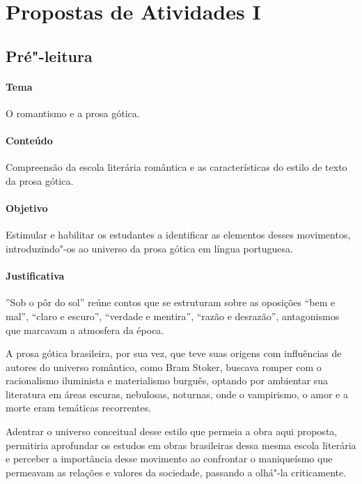 \documentclass[12pt]{extarticle}
\begin{document}
\tableofcontents


\section{Propostas de Atividades I}


\subsection{Pré"-leitura}


\paragraph{Tema} O romantismo e a prosa gótica.

\paragraph{Conteúdo} Compreensão da escola literária romântica e as 
características do estilo de texto da prosa gótica.

\paragraph{Objetivo} Estimular e habilitar os estudantes a identificar as 
elementos desses movimentos, introduzindo"-os ao universo da prosa gótica
em língua portuguesa.  

\paragraph{Justificativa} ''Sob o pôr do sol'' reúne contos que se estruturam 
sobre as oposições ``bem e mal'', ``claro e escuro'', ``verdade e mentira'', 
``razão e desrazão'', antagonismos que marcavam a atmosfera da época.

A prosa gótica brasileira, por sua vez, que teve suas origens com influências de autores do
universo romântico, como Bram Stoker, buscava romper com o racionalismo iluminista 
e materialismo burguês, optando por ambientar sua literatura em áreas escuras, nebulosas,
noturnas, onde o vampirismo, o amor e a morte eram temáticas recorrentes. 

Adentrar o universo conceitual desse estilo que permeia a obra aqui proposta, permitiria
aprofundar os estudos em obras brasileiras dessa mesma escola literária e perceber a importância
desse movimento ao confrontar o maniqueísmo que permeavam as relações e valores da sociedade, 
passando a olhá"-la criticamente. 
\end{document}
